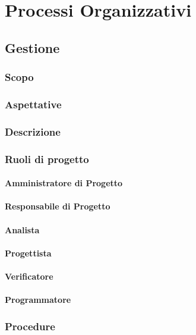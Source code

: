 \section{Processi Organizzativi}


\subsection{Gestione}

	\subsubsection{Scopo}
	\subsubsection{Aspettative}
	\subsubsection{Descrizione}
	\subsubsection{Ruoli di progetto}
		\paragraph{Amministratore di Progetto}
		\paragraph{Responsabile di Progetto}
		\paragraph{Analista}
		\paragraph{Progettista}
		\paragraph{Verificatore}
		\paragraph{Programmatore}
	\subsubsection{Procedure}
